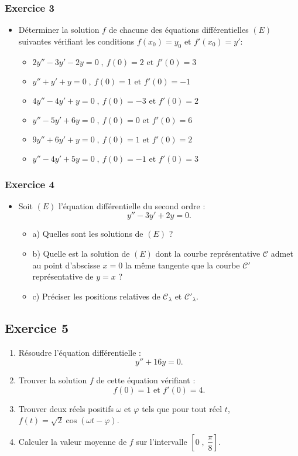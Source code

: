 \documentclass[12pt]{article}
\begin{document}
\subsubsection*{Exercice 3}
\begin{itemize}
    \item Déterminer la solution \(f\) de chacune des équations différentielles \((E)\) suivantes vérifiant les conditions \(f(x_{0})=y_{0}\text{ et }f'(x_{0})=y'\):
    \begin{itemize}
        \item \(2y''-3y'-2y=0\;,\ f(0)=2\text{ et }f'(0)=3\)
        \item \(y''+y'+y=0\;,\ f(0)=1\text{ et }f'(0)=-1\)
        \item \(4y''-4y'+y=0\;,\ f(0)=-3\text{ et }f'(0)=2\)
        \item \(y''-5y'+6y=0\;,\ f(0)=0\text{ et }f'(0)=6\)
        \item \(9y''+6y'+y=0\;,\ f(0)=1\text{ et }f'(0)=2\)
        \item \(y''-4y'+5y=0\;,\ f(0)=-1\text{ et }f'(0)=3\)
    \end{itemize}
\end{itemize}
\subsubsection*{Exercice 4}
\begin{itemize}
    \item Soit \((E)\) l'équation différentielle du second ordre :
    \[y''-3y'+2y=0.\]
    \begin{itemize}
        \item a) Quelles sont les solutions de \((E)\) ?
        \item b) Quelle est la solution de \((E)\) dont la courbe représentative \(\mathcal{C}\) admet au point d'abscisse \(x=0\) la même tangente que la courbe \(\mathcal{C'}\) représentative de \(y=x\) ?
        \item c) Préciser les positions relatives de \(\mathcal{C}_{\lambda}\) et \(\mathcal{C'}_{\lambda}.\)
    \end{itemize}
\end{itemize}
\subsection*{Exercice 5}
\begin{enumerate}
    \item Résoudre l'équation différentielle :
    \[y''+16y=0.\]
    \item Trouver la solution \(f\) de cette équation vérifiant :
    \[f(0)=1\text{ et }f'(0)=4.\]
    \item Trouver deux réels positifs \(\omega\) et \(\varphi\) tels que pour tout réel \(t\), \(f(t)=\sqrt{2} \cos(\omega t-\varphi)\).
    \item Calculer la valeur moyenne de \(f\) sur l'intervalle \(\left[0\;,\ \dfrac{\pi}{8}\right]\).
\end{enumerate}
\end{document}
